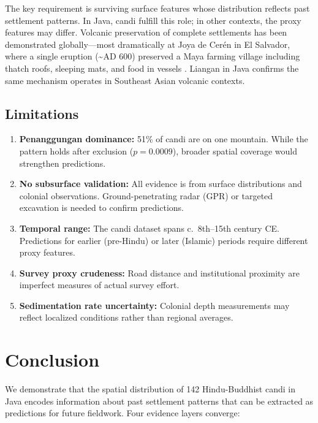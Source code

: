 \documentclass[12pt,a4paper]{article}
\begin{document}
The key requirement is surviving surface features whose distribution reflects past settlement patterns. In Java, candi fulfill this role; in other contexts, the proxy features may differ. Volcanic preservation of complete settlements has been demonstrated globally---most dramatically at Joya de Cer\'{e}n in El Salvador, where a single eruption (\textasciitilde AD 600) preserved a Maya farming village including thatch roofs, sleeping mats, and food in vessels \citep{sheets2002}. Liangan in Java confirms the same mechanism operates in Southeast Asian volcanic contexts.

\subsection{Limitations}

\begin{enumerate}
    \item \textbf{Penanggungan dominance:} 51\% of candi are on one mountain. While the pattern holds after exclusion ($p=0.0009$), broader spatial coverage would strengthen predictions.
    \item \textbf{No subsurface validation:} All evidence is from surface distributions and colonial observations. Ground-penetrating radar (GPR) or targeted excavation is needed to confirm predictions.
    \item \textbf{Temporal range:} The candi dataset spans c.\ 8th--15th century CE. Predictions for earlier (pre-Hindu) or later (Islamic) periods require different proxy features.
    \item \textbf{Survey proxy crudeness:} Road distance and institutional proximity are imperfect measures of actual survey effort.
    \item \textbf{Sedimentation rate uncertainty:} Colonial depth measurements may reflect localized conditions rather than regional averages.
\end{enumerate}

\section{Conclusion}

We demonstrate that the spatial distribution of 142 Hindu-Buddhist candi in Java encodes information about past settlement patterns that can be extracted as predictions for future fieldwork. Four evidence layers converge:
\end{document}
